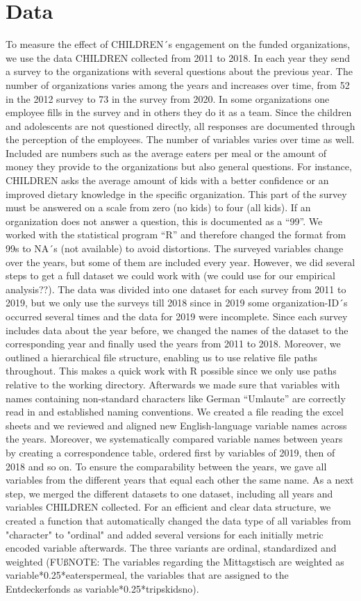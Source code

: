 \documentclass[12pt, a4paper, titlepage]{article}\usepackage[]{graphicx}\usepackage[]{color}
\begin{document}
\section{Data}

To measure the effect of CHILDREN´s engagement on the funded organizations, we use the data CHILDREN collected from 2011 to 2018. In each year they send a survey to the organizations with several questions about the previous year. The number of organizations varies among the years and increases over time, from 52 in the 2012 survey to 73 in the survey from 2020. In some organizations one employee fills in the survey and in others they do it as a team. Since the children and adolescents are not questioned directly, all responses are documented through the perception of the employees. The number of variables varies over time as well. Included are numbers such as the average eaters per meal or the amount of money they provide to the organizations but also general questions. For instance, CHILDREN asks the average amount of kids with a better confidence or an improved dietary knowledge in the specific organization. This part of the survey must be answered on a scale from zero (no kids) to four (all kids). If an organization does not answer a question, this is documented as a “99”. We worked with the statistical program “R” and therefore changed the format from 99s to NA´s (not available) to avoid distortions. The surveyed variables change over the years, but some of them are included every year. 
However, we did several steps to get a full dataset we could work with (we could use for our empirical analysis??). The data was divided into one dataset for each survey from 2011 to 2019, but we only use the surveys till 2018 since in 2019 some organization-ID´s occurred several times and the data for 2019 were incomplete. Since each survey includes data about the year before, we changed the names of the dataset to the corresponding year and finally used the years from 2011 to 2018. Moreover, we outlined a hierarchical file structure, enabling us to use relative file paths throughout. This makes a quick work with R possible since we only use paths relative to the working directory. Afterwards we made sure that variables with names containing non-standard characters like German “Umlaute” are correctly read in and established naming conventions. We created a file reading the excel sheets and we reviewed and aligned new English-language variable names across the years. Moreover, we systematically compared variable names between years by creating a correspondence table, ordered first by variables of 2019, then of 2018 and so on. To ensure the comparability between the years, we gave all variables from the different years that equal each other the same name. As a next step, we merged the different datasets to one dataset, including all years and variables CHILDREN collected. For an efficient and clear data structure, we created a function that automatically changed the data type of all variables from "character" to "ordinal" and added several versions for each initially metric encoded variable afterwards. The three variants are ordinal, standardized and weighted (FUßNOTE: The variables regarding the Mittagstisch are weighted as variable*0.25*eaterspermeal, the variables that are assigned to the Entdeckerfonds as variable*0.25*tripskidsno). 
\end{document}

